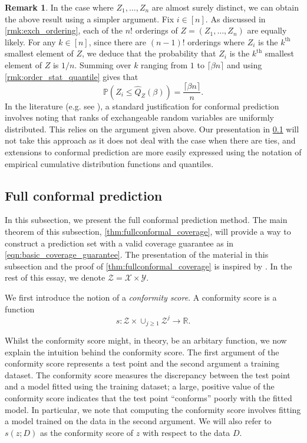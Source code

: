 \documentclass[11pt, titlepage]{article} %
\newcommand{\Prob}[1]{\mathbb{P}\left( #1 \right)}
\numberwithin{equation}{section}
\theoremstyle{definition}
\newtheorem{remark}{Remark}
\numberwithin{theorem}{section}
\numberwithin{lemma}{section}
\numberwithin{corollary}{section}
\numberwithin{proposition}{section}
\numberwithin{definition}{section}
\numberwithin{remark}{section}
\begin{document}
\begin{remark}
    In the case where \(Z_1, \ldots, Z_n\) are almost surely distinct, we can obtain the above result using a simpler argument. Fix \(i \in [n]\). As discussed in \cref{rmk:exch_ordering}, each of the \(n!\) orderings of \(Z = (Z_1, \ldots, Z_n)\) are equally likely. For any \(k \in [n]\), since there are \((n-1)!\) orderings where \(Z_i\) is the \(k^\mathrm{th}\) smallest element of \(Z\), we deduce that the probability that \(Z_i\) is the \(k^\mathrm{th}\) smallest element of \(Z\) is \(1/n\). Summing over \(k\) ranging from \(1\) to \(\lceil \beta n \rceil\) and using \cref{rmk:order_stat_quantile} gives that \[\Prob{Z_i \leq \hat{Q}_Z(\beta)} = \frac{\lceil{\beta n}\rceil}{n}.\] In the literature (e.g. see \cite{lei2018,angelopoulos2021gentle}), a standard justification for conformal prediction involves noting that ranks of exchangeable random variables are uniformly distributed. This relies on the argument given above. Our presentation in \cref{subsec:fullconformal} will not take this approach as it does not deal with the case when there are ties, and extensions to conformal prediction are more easily expressed using the notation of empirical cumulative distribution functions and quantiles.
\label{rmk:exch_rank_argument}
\end{remark}

\subsection{Full conformal prediction}
\label{subsec:fullconformal}

In this subsection, we present the full conformal prediction method. The main theorem of this subsection, \cref{thm:fullconformal_coverage}, will provide a way to construct a prediction set with a valid coverage guarantee as in \eqref{eqn:basic_coverage_guarantee}. The presentation of the material in this subsection and the proof of \cref{thm:fullconformal_coverage} is inspired by \cite{angelopoulos2024theoreticalfoundationsconformalprediction}. In the rest of this essay, we denote \(\mathcal{Z} = \mathcal{X} \times \mathcal{Y}\). \vskip5pt

\noindent
We first introduce the notion of a \textit{conformity score}. A conformity score is a function \[s:\mathcal{Z} \times \cup_{j \geq 1} \mathcal{Z}^j \to \mathbb{R}.\]

\noindent
Whilst the conformity score might, in theory, be an arbitary function, we now explain the intuition behind the conformity score. The first argument of the conformity score represents a test point and the second argument a training dataset. The conformity score measures the discrepancy between the test point and a model fitted using the training dataset; a large, positive value of the conformity score indicates that the test point ``conforms'' poorly with the fitted model. In particular, we note that computing the conformity score involves fitting a model trained on the data in the second argument. We will also refer to \(s(z;D)\) as the conformity score of \(z\) with respect to the data \(D\).
\end{document}
